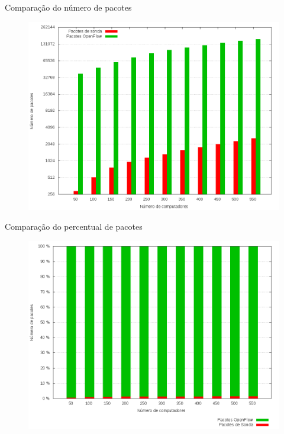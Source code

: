 \begin{frame}{Comparação do número de pacotes}

    \begin{figure}[!htb]
        \centering
        \includegraphics[scale=.35]{images/npings-x-packets-in}
    \end{figure}
\end{frame}


\begin{frame}{Comparação do percentual de pacotes}

    \begin{figure}[!htb]
        \centering
        \includegraphics[scale=.35]{images/npings-x-packets-in-stacked}
    \end{figure}
\end{frame}



